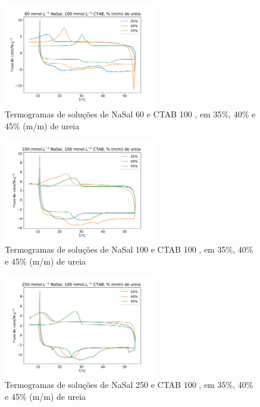 		\begin{figure}[H]
			\centering
			\includegraphics[width=0.60\textwidth]{./imagens/dsc/NaSal60}
			\caption{Termogramas de soluções de NaSal 60\mM{} e CTAB 100 \mM{}, em 35\%, 40\% e 45\% (m/m) de ureia}
			\label{fig:DSC_NaSal60}
		\end{figure}
	
		\begin{figure}[H]
			\centering
			\includegraphics[width=0.60\textwidth]{./imagens/dsc/NaSal100}
			\caption{Termogramas de soluções de NaSal 100\mM{} e CTAB 100 \mM{}, em 35\%, 40\% e 45\% (m/m) de ureia}
			\label{fig:DSC_NaSal100}
		\end{figure}

		\begin{figure}[H]
			\centering
			\includegraphics[width=0.60\textwidth]{./imagens/dsc/NaSal250}
			\caption{Termogramas de soluções de NaSal 250\mM{} e CTAB 100 \mM{}, em 35\%, 40\% e 45\% (m/m) de ureia}
			\label{fig:DSC_NaSal250}
		\end{figure}
	
